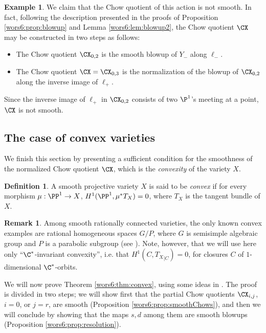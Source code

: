 \documentclass[reqno]{amsproc}
\theoremstyle{definition}
\newtheorem{definition}[theorem]{Definition}
\newtheorem{remark}[theorem]{Remark}
\newtheorem{example}[theorem]{Example}
\begin{document}
\begin{example}
We claim that the Chow quotient of this action is not smooth. 
In fact, following the description presented in the proofs of Proposition \ref{wors6:prop:blowup} and Lemma \ref{wors6:lem:blowup2}, the Chow quotient $\CX$ may be constructed in two steps  as follows:
\begin{itemize}
\item The Chow quotient $\CX_{0,2}$ is the smooth blowup of $Y_-$ along $\ell_-$. 
\item The Chow quotient $\CX=\CX_{0,3}$ is the normalization of the blowup of $\CX_{0,2}$ along the inverse image of $\ell_+$. 
\end{itemize}
Since the inverse image of $\ell_+$ in $\CX_{0,2}$ consists of two $\P^1$'s meeting at a point, $\CX$ is not smooth.
\end{example}

\subsection{The case of convex varieties}\label{wors6:ssec:convex}

We finish this section by presenting a sufficient condition for the smoothness of the normalized Chow quotient $\CX$,  
which is the {\em convexity} of the variety $X$.

\begin{definition}\cite[0.4]{wors6-FP}
A smooth projective variety $X$ is said to be {\em convex} if for every morphism $\mu: \PP^1 \to X$, $H^1(\PP^1,\mu^*T_X)=0$, where $T_X$ is the tangent bundle of $X$.
\end{definition}

\begin{remark}\label{wors6:rem:convorbits}
Among smooth rationally connected varieties, the only known convex examples are rational homogeneous spaces $G/P$, where $G$ is semisimple algebraic group and $P$ is a parabolic subgroup (see \cite{wors6-Pandharipande}). Note, however, that we will use here only ``$\C^*$-invariant convexity'', i.e. that $H^1(C,{T_X}_{|C})=0$, for closures $C$ of $1$-dimensional $\C^*$-orbits.
\end{remark}

We will now prove Theorem \ref{wors6:thm:convex}, using some ideas in \cite{wors6-FP,wors6-MMW}. The proof is divided in two steps; we will show first that the partial Chow quotients $\CX_{i,j}$, $i=0$, or $j=r$, are smooth (Proposition \ref{wors6:prop:smoothChows}), and then we will conclude by showing that the maps $s,d$ among them are smooth blowups (Proposition \ref{wors6:prop:resolution}).
\end{document}
